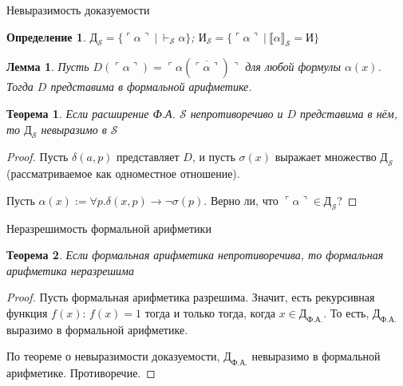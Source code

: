 \documentclass[aspectratio=169]{beamer}
\newtheorem{thm}{Теорема}[section]
\newtheorem{dfn}{Определение}[section]
\newtheorem{lmm}{Лемма}[section]
\begin{document}
\begin{frame}{Невыразимость доказуемости}
\begin{dfn}
$\text{Д}_\mathcal{S} = \{ \ulcorner\alpha\urcorner\ |\ \vdash_\mathcal{S}\alpha \}$; 
$\text{И}_\mathcal{S} = \{ \ulcorner\alpha\urcorner\ |\ \llbracket\alpha\rrbracket_\mathcal{S} = \text{И} \}$
\end{dfn}

\begin{lmm}Пусть $D(\ulcorner\alpha\urcorner) = \ulcorner\alpha(\overline{\ulcorner\alpha\urcorner})\urcorner$ для
любой формулы $\alpha(x)$. Тогда $D$ представима в формальной арифметике.
\end{lmm}


\begin{thm}Если расширение Ф.А. $\mathcal{S}$ непротиворечиво и $D$ представима в нём, то $\text{Д}_\mathcal{S}$ невыразимо в $\mathcal{S}$\end{thm}

\begin{proof}Пусть $\delta(a,p)$ представляет $D$, и пусть $\sigma(x)$ выражает множество $\text{Д}_\mathcal{S}$ (рассматриваемое как
одноместное отношение).

Пусть $\alpha(x) := \forall p.\delta(x,p)\rightarrow\neg\sigma(p)$. Верно ли, что $\ulcorner\alpha\urcorner\in\text{Д}_\mathcal{S}$?
\end{proof}
\end{frame}

\begin{frame}{Неразрешимость формальной арифметики}
\begin{thm}Если формальная арифметика непротиворечива, то формальная арифметика неразрешима\end{thm}
\begin{proof}
Пусть формальная арифметика разрешима. 
Значит, есть рекурсивная функция $f(x)$: $f(x)=1$ тогда и только тогда, 
когда $x \in \text{Д}_\text{Ф.А.}$. То есть, $\text{Д}_\text{Ф.А.}$ выразимо в формальной арифметике.

По теореме о невыразимости доказуемости, 
$\text{Д}_\text{Ф.А.}$ невыразимо в формальной арифметике. Противоречие.
\end{proof}
\end{frame}
\end{document}

